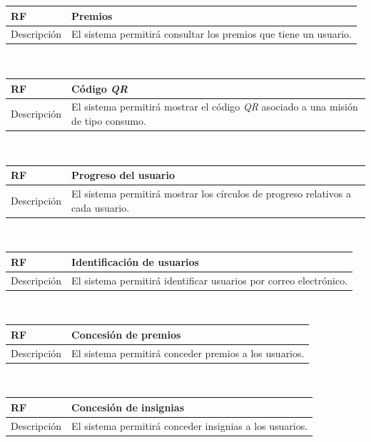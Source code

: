\documentclass[twoside]{report}
\newcommand\addrow[2]{#1 &#2\\ }
\newcommand\addheading[2]{#1 &#2\\ \hline}
\newcommand\tabularhead{\begin{tabular}{lp{0.7\textwidth}}
\hline
}
\newenvironment{req}{\tabularhead}
{\hline\end{tabular}}
\begin{document}
\vspace{0.25cm}

\begin{req}
	\addheading{\textbf{RF\arabic{functionalRequirements}}}{Premios}
	\addrow{Descripción}{El sistema permitirá consultar los premios que tiene un usuario.}
\end{req}\\

\vspace{0.25cm}

\begin{req}
	\addheading{\textbf{RF\arabic{functionalRequirements}}}{Código \textit{QR}}
	\addrow{Descripción}{El sistema permitirá mostrar el código \textit{QR} asociado a una misión de tipo consumo.}
\end{req}\\

\vspace{0.25cm}

\begin{req}
	\addheading{\textbf{RF\arabic{functionalRequirements}}}{Progreso del usuario}
	\addrow{Descripción}{El sistema permitirá mostrar los círculos de progreso relativos a cada usuario.}
\end{req}\\

\vspace{0.25cm}

\begin{req}
	\addheading{\textbf{RF\arabic{functionalRequirements}}}{Identificación de usuarios}
	\addrow{Descripción}{El sistema permitirá identificar usuarios por correo electrónico.}
\end{req}\\

\vspace{0.25cm}

\begin{req}
	\addheading{\textbf{RF\arabic{functionalRequirements}}}{Concesión de premios}
	\addrow{Descripción}{El sistema permitirá conceder premios a los usuarios.}
\end{req}\\

\vspace{0.25cm}

\begin{req}
	\addheading{\textbf{RF\arabic{functionalRequirements}}}{Concesión de insignias}
	\addrow{Descripción}{El sistema permitirá conceder insignias a los usuarios.}
\end{req}\\
\end{document}

